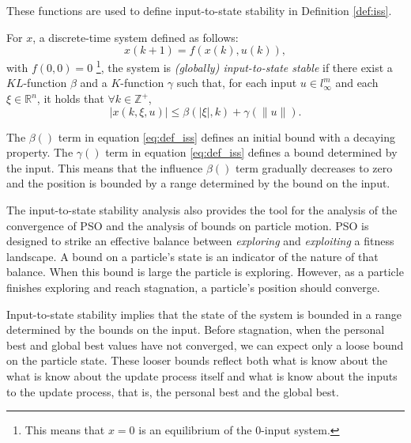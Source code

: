 These functions are used to define input-to-state stability in Definition \ref{def:iss}.

\begin{mydef}
\label{def:iss}

For $ x $, a discrete-time system defined as follows:
\begin{equation}
\label{eq:dis_nonlinear}
x(k+1) = f( x(k) , u(k) ),
\end{equation}
with $ f(0,0) = 0 $
\footnote{This means that $ x = 0 $ is an equilibrium of the 0-input system.}, the system is \emph{(globally) input-to-state stable} if there exist a $ KL $-function $ \beta  $ and a $ K $-function $ \gamma $ such that, for each input $ u \in l^{m}_{\infty} $ and each $ \xi \in \mathbb{R}^{n} $, it holds that $  \forall k \in \mathbb{Z}^{+} $,
\begin{equation}
\label{eq:def_iss}
| x(k, \xi, u) | \leq \beta (| \xi |, k) + \gamma (\lVert u \rVert).
\end{equation}
\end{mydef}

The $ \beta () $ term in equation \eqref{eq:def_iss} defines an initial bound with a decaying property.
The $ \gamma () $ term in equation \eqref{eq:def_iss} defines a bound determined by the input.
This means that the influence $ \beta () $ term gradually decreases to zero and the position is bounded by a range determined by the bound on the input.


The input-to-state stability analysis also provides the tool for the analysis of the convergence of PSO and the analysis of bounds on particle motion.
PSO is designed to strike an effective balance between \emph{exploring} and \emph{exploiting} a fitness landscape.
A bound on a particle's state is an indicator of the nature of that balance.
When this bound is large the particle is exploring.
However, as a particle finishes exploring and reach stagnation, a particle's position should converge.

Input-to-state stability implies that the state of the system is bounded in a range determined by the bounds on the input.
Before stagnation, when the personal best and global best values have not converged, we can expect only a loose bound on the particle state.
These looser bounds reflect both what is know about the what is know about the update process itself and what is know about the inputs to the update process, that is, the personal best and the global best.

